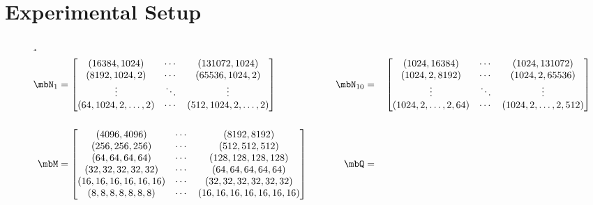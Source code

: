 \section{Experimental Setup}
\label{sec:experimental.setup}

\begin{figure*}[t]
\begin{footnotesize}¸
\begin{alignat*}{3}
\mbN_1 &=
\begin{bmatrix}
(16384,1024 )          & \cdots & (131072, 1024) \\
(8192,1024, 2)         & \cdots & (65536, 1024, 2) \\
\vdots                 & \ddots & \vdots \\
(64,1024, 2,\dots,2)   & \cdots & (512, 1024, 2,\dots,2) \\
\end{bmatrix}
\quad
\quad
&\mbN_{10} &= &&
\begin{bmatrix}
(1024, 16384)          & \cdots & (1024, 131072) \\
(1024, 2,8192)         & \cdots & (1024,2,65536) \\
\vdots                 & \ddots & \vdots \\
(1024, 2,\dots,2,64)   & \cdots & (1024,2,\dots,2, 512) \\
\end{bmatrix}\\[0.5cm]
\mbM &=
\begin{bmatrix}
(4096,4096)           & \cdots & (8192, 8192) \\
(256,256,256)         & \cdots & (512, 512, 512) \\
(64,64,64,64)         & \cdots & (128, 128, 128,128) \\
(32,32,32,32,32)      & \cdots & (64,  64,  64, 64, 64) \\
(16,16,16,16,16,16)   & \cdots & (32,  32,  32, 32, 32, 32) \\
(8, 8, 8,  8, 8, 8,8) & \cdots & (16,  16,  16, 16, 16, 16, 16) \\
\end{bmatrix}
\quad
\quad
&\mbQ &=&& 

\end{alignat*}
\end{footnotesize}
\end{figure*}
